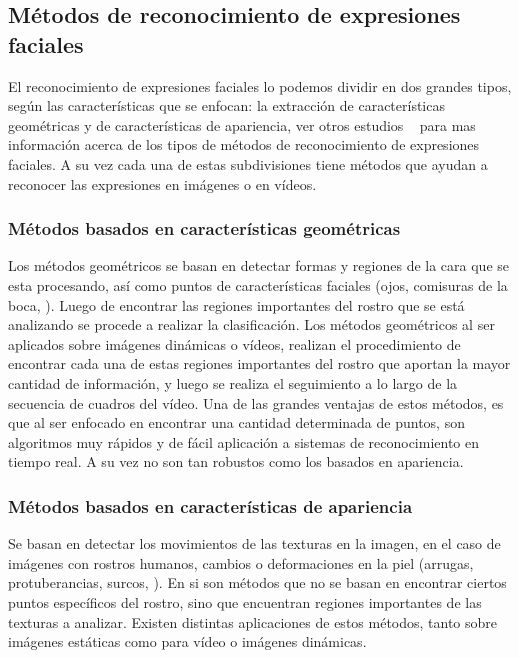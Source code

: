 \subsection{Métodos de reconocimiento de expresiones faciales}
El reconocimiento de expresiones faciales lo podemos dividir en dos grandes tipos, según las características que se enfocan: la extracción de características geométricas y de características de apariencia, ver otros estudios ~\cite{Pantic2000,Zeng2009} para mas información acerca de los tipos de métodos de reconocimiento de expresiones faciales. A su vez cada una de estas subdivisiones tiene métodos que ayudan a reconocer las expresiones en imágenes o en vídeos.

\subsubsection{Métodos basados en características geométricas}
\label{sec:met_geo}
Los métodos geométricos se basan en detectar formas y regiones de la cara que se esta procesando, así como puntos de características faciales (\eg ojos, comisuras de la boca, \etc). 
Luego de encontrar las regiones importantes del rostro que se está analizando se procede a realizar la clasificación. Los métodos geométricos al ser aplicados sobre imágenes dinámicas o vídeos, realizan el procedimiento de encontrar cada una de estas regiones importantes del rostro que aportan la mayor cantidad de información, y luego se realiza el seguimiento a lo largo de la secuencia de cuadros del vídeo. Una de las grandes ventajas de estos métodos, es que al ser enfocado en encontrar una cantidad determinada de puntos, son algoritmos muy rápidos y de fácil aplicación a sistemas de reconocimiento en tiempo real. A su vez no son tan robustos como los basados en apariencia.


\subsubsection{Métodos basados en características de apariencia}
\label{sec:met_apa}
Se basan en detectar los movimientos de las texturas en la imagen, en el caso de imágenes con rostros humanos, cambios o deformaciones en la piel (\eg arrugas, protuberancias, surcos, \etc). En si son métodos que no se basan en encontrar ciertos puntos específicos del rostro, sino que encuentran regiones importantes de las texturas a analizar. Existen distintas aplicaciones de estos métodos, tanto sobre imágenes estáticas como para vídeo o imágenes dinámicas.  

